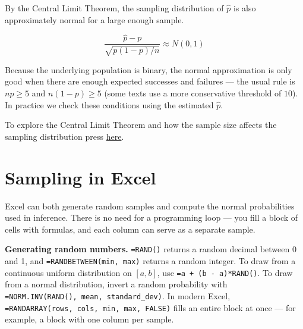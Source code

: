 \documentclass[
  11pt,
  letterpaper,
  DIV=11,
  numbers=noendperiod,
  oneside,
  open=any]{scrreprt}
\begin{document}
By the Central Limit Theorem, the sampling distribution of \(\hat{p}\)
is also approximately normal for a large enough sample.

\begin{bsformula}

\[\frac{\hat{p} - p}{\sqrt{p(1-p)/n}} \approx N(0, 1)\]

\end{bsformula}

Because the underlying population is binary, the normal approximation is
only good when there are enough expected successes and failures --- the
usual rule is \(np \geq 5\) and \(n(1-p) \geq 5\) (some texts use a more
conservative threshold of \(10\)). In practice we check these conditions
using the estimated \(\hat{p}\).

\begin{tcolorbox}[enhanced jigsaw, breakable, left=2mm, title=\textcolor{quarto-callout-note-color}{\faInfo}\hspace{0.5em}{Note}, coltitle=black, colframe=quarto-callout-note-color-frame, rightrule=.15mm, toprule=.15mm, arc=.35mm, opacityback=0, titlerule=0mm, bottomtitle=1mm, toptitle=1mm, colback=white, colbacktitle=quarto-callout-note-color!10!white, opacitybacktitle=0.6, leftrule=.75mm, bottomrule=.15mm]

To explore the Central Limit Theorem and how the sample size affects the
sampling distribution press
\href{https://jagelves.shinyapps.io/Central/}{here}.

\end{tcolorbox}

\section{Sampling in Excel}\label{sampling-in-excel}

Excel can both generate random samples and compute the normal
probabilities used in inference. There is no need for a programming loop
--- you fill a block of cells with formulas, and each column can serve
as a separate sample.

\textbf{Generating random numbers.} \texttt{=RAND()} returns a random
decimal between 0 and 1, and \texttt{=RANDBETWEEN(min,\ max)} returns a
random integer. To draw from a continuous uniform distribution on
\([a, b]\), use \texttt{=a\ +\ (b\ -\ a)*RAND()}. To draw from a normal
distribution, invert a random probability with
\texttt{=NORM.INV(RAND(),\ mean,\ standard\_dev)}. In modern Excel,
\texttt{=RANDARRAY(rows,\ cols,\ min,\ max,\ FALSE)} fills an entire
block at once --- for example, a block with one column per sample.
\end{document}
